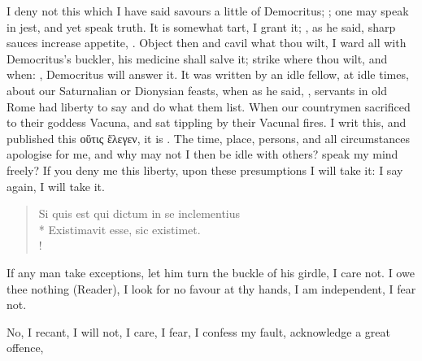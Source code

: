 I deny not this which I have said savours a little of Democritus;
; one may
speak in jest, and yet speak truth. It is somewhat tart, I grant it;
, as he said, sharp sauces increase
appetite, .
Object then and cavil what thou wilt, I ward all with
Democritus's buckler, his medicine shall salve it; strike
where thou wilt, and when: , Democritus will answer it. It
was written by an idle fellow, at idle times, about our Saturnalian or
Dionysian feasts, when as he said, ,
servants in old Rome had liberty to say and do what them list. When our
countrymen sacrificed to their goddess Vacuna, and sat
tippling by their Vacunal fires. I writ this, and published this
\textgreek{οὕτις ἕλεγεν}, it is . The time, place, persons,
and all circumstances apologise for me, and why may not I then be idle with
others? speak my mind freely? If you deny me this liberty, upon these
presumptions I will take it: I say again, I will take it.

\begin{latin}
\begin{verse}%
Si quis est qui dictum in se inclementius\\*
Existimavit esse, sic existimet.\\!
\end{verse}%
\end{latin}

If any man take exceptions, let him turn the buckle of his girdle, I care not.
I owe thee nothing (Reader), I look for no favour at thy hands, I am
independent, I fear not.

No, I recant, I will not, I care, I fear, I confess my fault, acknowledge a
great offence,


